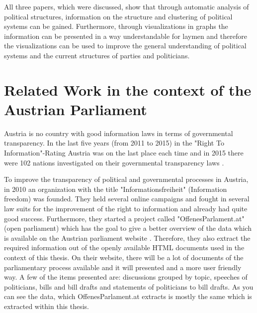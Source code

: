 All three papers, which were discussed, show that through automatic analysis of political structures, information on the structure and clustering of political systems can be gained. Furthermore, through visualizations in graphs the information can be presented in a way understandable for laymen and therefore the visualizations can be used to improve the general understanding of political systems and the current structures of parties and politicians.

\section{Related Work in the context of the Austrian Parliament}
Austria is no country with good information laws in terms of governmental transparency. In the last five years (from 2011 to 2015) in the "Right To Information"-Rating Austria was on the last place each time and in 2015 there were 102 nations investigated on their governmental transparency laws \cite{Informationsfreiheit_2015}.

To improve the transparency of political and governmental processes in Austria, in 2010 an organization with the title "Informationsfreiheit" (Information freedom) \cite{Informationsfreiheit_2015} was founded. They held several online campaigns and fought in several law suits for the improvement of the right to information and already had quite good success. Furthermore, they started a project called "OffenesParlament.at" (open parliament) \cite{Informationsfreiheit_2015} which has the goal to give a better overview of the data which is available on the Austrian parliament website \cite{AustrianParliament_2015}. Therefore, they also extract the required information out of the openly available HTML documents used in the context of this thesis. On their website, there will be a lot of documents of the parliamentary process available and it will presented and a more user friendly way. A few of the items presented are: discussions grouped by topic, speeches of politicians, bills and bill drafts and statements of politicians to bill drafts. As you can see the data, which OffenesParlament.at extracts is mostly the same which is extracted within this thesis.


